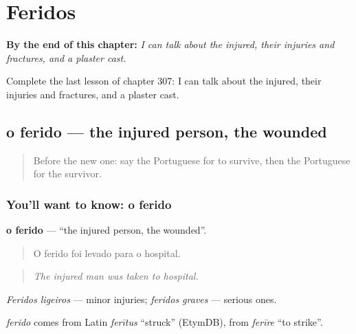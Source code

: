
\chapter{Feridos}
\label{ch:pt-feridos}

\begin{chapteropening}
\textbf{By the end of this chapter:} \emph{I can talk about the injured, their injuries and fractures, and a plaster cast.}

Complete the last lesson of chapter 307: I can talk about the injured, their injuries and fractures, and a plaster cast.
\end{chapteropening}

\section[o ferido]{o ferido — the injured person, the wounded}

\label{lesson:PT-C307-ferido}



\begin{quote}
Before the new one: say the Portuguese for to survive, then the Portuguese for the survivor.
\end{quote}

\subsection*{You'll want to know: o ferido}
\textbf{o ferido} — \textquotedblleft{}the injured person, the wounded\textquotedblright{}.

\begin{quote}
O ferido foi levado para o hospital.
\end{quote}

\begin{quote}
\emph{The injured man was taken to hospital.}
\end{quote}

\emph{Feridos ligeiros} — minor injuries; \emph{feridos graves} — serious ones.

\begin{cousinweb}
\emph{ferido} comes from Latin \emph{ferītus} \textquotedblleft{}struck\textquotedblright{} (EtymDB), from \emph{ferīre} \textquotedblleft{}to strike\textquotedblright{}.
\end{cousinweb}


